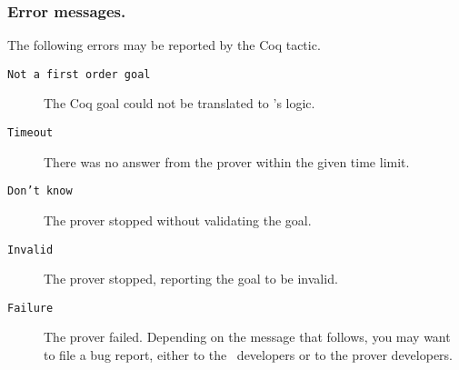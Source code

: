\subsubsection{Error messages.} The following errors may be reported by
the Coq tactic.
\begin{description}
\item[\texttt{Not a first order goal}]\emptyitem
  The Coq goal could not be translated to \why's logic.
\item[\texttt{Timeout}]\emptyitem
  There was no answer from the prover within the given time limit.
\item[\texttt{Don't know}]\emptyitem
  The prover stopped without validating the goal.
\item[\texttt{Invalid}]\emptyitem
  The prover stopped, reporting the goal to be invalid.
\item[\texttt{Failure}]\emptyitem
  The prover failed. Depending on the message that follows, you may
  want to file a bug report, either to the \why\ developers or to the
  prover developers.
\end{description}

